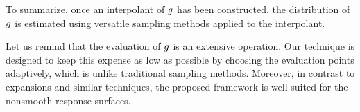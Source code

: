 To summarize, once an interpolant of $g$ has been constructed, the distribution
of $g$ is estimated using versatile sampling methods applied to the
interpolant. 

Let us remind that the evaluation of $g$ is an extensive operation. Our
technique is designed to keep this expense as low as possible by choosing the
evaluation points adaptively, which is unlike traditional sampling methods.
Moreover, in contrast to  expansions and similar techniques, the proposed
framework is well suited for the nonsmooth response surfaces.
